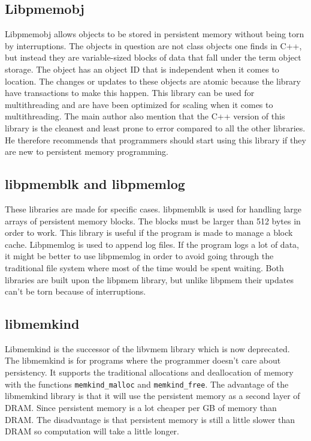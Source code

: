 \documentclass[12pt,a4paper,UKenglish]{article}
\begin{document}
\subsection{Libpmemobj}
Libpmemobj\cite{libpmemobj} allows objects to be stored in persistent memory without being torn by interruptions. The objects in question are not class objects one finds in C++, but instead they are variable-sized blocks of data that fall under the term object storage. The object has an object ID that is independent when it comes to location. The changes or updates to these objects are atomic because the library have transactions to make this happen. This library can be used for multithreading and are have been optimized for scaling when it comes to multithreading. The main author also mention that the C++ version of this library is the cleanest and least prone to error compared to all the other libraries\cite{Rudoff}. He therefore recommends that programmers should start using this library if they are new to persistent memory programming. 

\subsection{libpmemblk and libpmemlog}
These libraries are made for specific cases. 
libpmemblk\cite{libpmemblk} is used for handling large arrays of persistent memory blocks. The blocks must be larger than 512 bytes in order to work. This library is useful if the program is made to manage a block cache. Libpmemlog\cite{libpmemlog} is used to append log files. If the program logs a lot of data, it might be better to use libpmemlog in order to avoid going through the traditional file system where most of the time would be spent waiting. 
Both libraries are built upon the libpmem library, but unlike libpmem their updates can’t be torn because of interruptions.

\subsection{libmemkind}
Libmemkind\cite{libmemking} is the successor of the libvmem\cite{libvmem} library which is now deprecated. The libmemkind is for programs where the programmer doesn’t care about persistency. It supports the traditional allocations and deallocation of memory with the functions \texttt{memkind\_malloc} and \texttt{memkind\_free}. The advantage of the libmemkind library is that it will use the persistent memory as a second layer of DRAM. Since persistent memory is a lot cheaper per GB of memory than DRAM. The disadvantage is that persistent memory is still a little slower than DRAM so computation will take a little longer.
\end{document}
